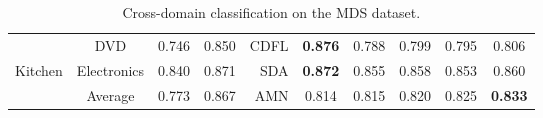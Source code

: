 \documentclass{article}
\begin{document}
\begin{table}[t]
{\begin{tabular}{|c|c||c|c||r|c||c|c||c|c|}
                                & DVD & 0.746 & 0.850 & CDFL \citep{Yang:2015nb} & \textbf{0.876} & 0.788 & 0.799 & 0.795 & 0.806 \\
    \multirow{-3}{*}{Kitchen} & Electronics & 0.840 & 0.871 & SDA \citep{glorot2011domain} & \textbf{0.872} & 0.855 & 0.858 & 0.853 & 0.860 \\\hline\hline
                                & Average & 0.773 & 0.867 & AMN \citep{Li:2017kg} & 0.814 & 0.815 & 0.820 & \cellcolor[HTML]{C0C0C0}0.825 & \cellcolor[HTML]{C0C0C0}\textbf{0.833}\\\hline
  \end{tabular}
  }
  \caption{Cross-domain classification on the MDS dataset.}
  \label{tab:mds}
\end{table}
\end{document}
